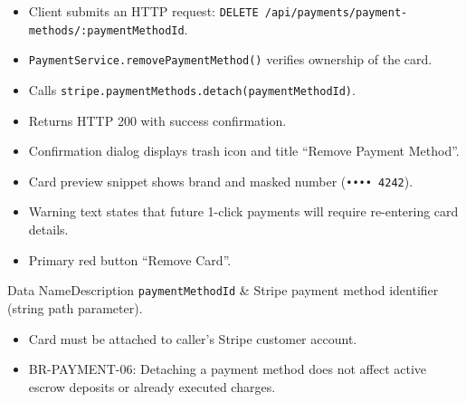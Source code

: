 \begin{itemize}[leftmargin=1.6em,topsep=3pt,itemsep=2pt,parsep=0pt,label=$\bullet$]
      \item Client submits an HTTP request: \texttt{DELETE /\allowbreak{}api/\allowbreak{}payments/\allowbreak{}payment-\allowbreak{}methods/\allowbreak{}:\allowbreak{}payment\allowbreak{}Method\allowbreak{}Id}.
      \item \texttt{PaymentService.\allowbreak{}remove\allowbreak{}Payment\allowbreak{}Method()} verifies ownership of the card.
      \item Calls \texttt{stripe.\allowbreak{}paymentMethods.\allowbreak{}detach(\allowbreak{}payment\allowbreak{}Method\allowbreak{}Id)}.
      \item Returns HTTP 200 with success confirmation.
\end{itemize}

\begin{itemize}[leftmargin=1.6em,topsep=3pt,itemsep=2pt,parsep=0pt,label=$\bullet$]
      \item Confirmation dialog displays trash icon and title ``Remove Payment Method''.
      \item Card preview snippet shows brand and masked number (\texttt{•••• 4242}).
      \item Warning text states that future 1-click payments will require re-entering card details.
      \item Primary red button ``Remove Card''.
\end{itemize}


\begin{specdatatable}{Data Name}{Description}
      \texttt{paymentMethodId} & Stripe payment method identifier (string path parameter).\\ \hline
\end{specdatatable}

\begin{itemize}[leftmargin=1.6em,topsep=3pt,itemsep=2pt,parsep=0pt,label=$\bullet$]
      \item Card must be attached to caller's Stripe customer account.
\end{itemize}

\begin{itemize}[leftmargin=1.6em,topsep=3pt,itemsep=2pt,parsep=0pt,label=$\bullet$]\brrulelist
      \item BR-PAYMENT-06: Detaching a payment method does not affect active escrow deposits or already executed charges.
\end{itemize}


